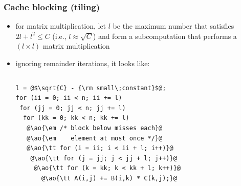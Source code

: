 \documentclass[12pt,dvipdfmx]{beamer}
\newcommand{\ao}[1]{{\color{blue}#1}}
\newcommand{\aka}[1]{{\color{red}#1}}
\begin{document}



\begin{frame}[fragile]
\frametitle{Cache blocking (tiling)}

\begin{itemize}
\item for matrix multiplication, let $l$ be the maximum number
that satisfies $2l + l^2\leq C$ (i.e., \ao{$l \approx \sqrt{C}$}) and form
a subcomputation that performs a $(l \times l)$ matrix multiplication

\item ignoring remainder iterations, it looks like:
\begin{columns}
\begin{column}{0.5\textwidth}
\begin{lstlisting}
l = @$\sqrt{C} - {\rm small\;constant}$@;
for (ii = 0; ii < n; ii += l)
 for (jj = 0; jj < n; jj += l)
  for (kk = 0; kk < n; kk += l)
   @\ao{\em /* block below misses each}@
   @\ao{\em    element at most once */}@
   @\ao{\tt for (i = ii; i < ii + l; i++)}@
    @\ao{\tt for (j = jj; j < jj + l; j++)}@
     @\ao{\tt for (k = kk; k < kk + l; k++)}@
       @\ao{\tt A(i,j) += B(i,k) * C(k,j);}@
\end{lstlisting}
\end{column}
\begin{column}{0.5\textwidth}
\def\svgwidth{1.0\textwidth}
{\tiny}
\end{column}
\end{columns}
\end{itemize}
\end{frame}
\end{document}
